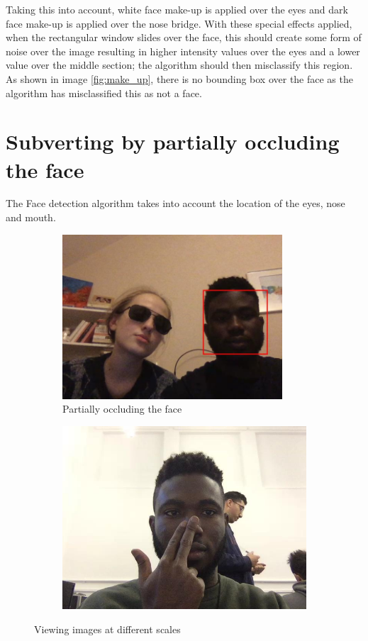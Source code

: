 \documentclass[a4paper,12pt]{article}
\begin{document}
Taking this into account, white face make-up is applied over the eyes and dark face make-up is applied over the nose bridge. With these special effects applied, when the rectangular window slides over the face, this should create some form of noise over the image resulting in higher intensity values over the eyes and a lower value over the middle section; the algorithm should then misclassify this region. As shown in image \ref{fig:make_up}, there is no bounding box over the face as the algorithm has misclassified this as not a face.



\section{Subverting by partially occluding the face}
The Face detection algorithm takes into account the location of the eyes, nose and mouth. 
	\begin{figure}[h!]
		\centering
		\begin{subfigure}{0.4\textwidth}
			\centering
			\includegraphics[width=0.9\textwidth]{images/spoof_julia_aj}
			\caption{Partially occluding the face}
			\label{fig:julia}
		\end{subfigure}
		\begin{subfigure}{0.4\textwidth}
			\centering
			\includegraphics[width=0.9\linewidth]{images/hand_nose}
			\caption{}
			\label{fig:aj_hand}
		\end{subfigure}
		\caption{Viewing images at different scales}
		\label{fig:scales}
	\end{figure}
\end{document}
